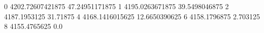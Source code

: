 0 4202.72607421875 47.24951171875
1 4195.0263671875 39.5498046875
2 4187.1953125 31.71875
4 4168.1416015625 12.6650390625
6 4158.1796875 2.703125
8 4155.4765625 0.0
